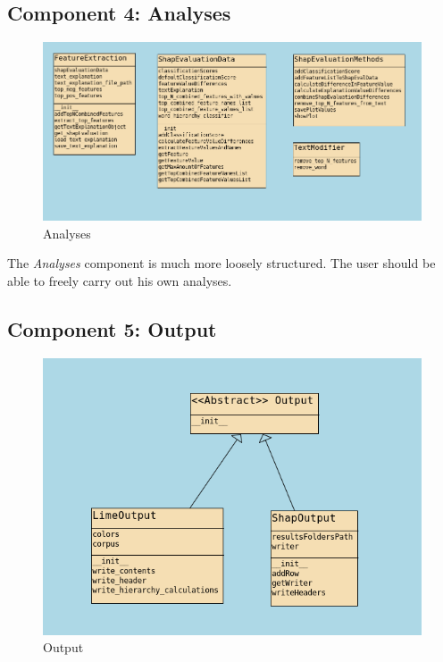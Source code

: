 \subsection{Component 4: Analyses}


\begin{figure}[H]
    \centering
    \includegraphics[width=\linewidth]{images/05_framework_eval/Analyses.png}
    \caption{Analyses}
    \label{fig:Analyses}
\end{figure}

The \textit{Analyses} component is much more loosely structured. The user should be able to freely carry out his own analyses.

\subsection{Component 5: Output}

\begin{figure}[H]
    \centering
    \includegraphics[width=\linewidth]{images/05_framework_eval/Output.png}
    \caption{Output}
    \label{fig:Output}
\end{figure}

